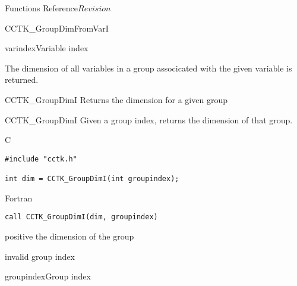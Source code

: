 \begin{cactuspart}{ Functions Reference}{}{$Revision$}
\begin{FunctionDescription}{CCTK\_GroupDimFromVarI}
\begin{ParameterSection}
\begin{Parameter}{varindex}Variable index\end{Parameter}
\end{ParameterSection}

\begin{Discussion}
The dimension of all variables in a group associcated with the given variable is returned.
\end{Discussion}

\begin{SeeAlsoSection}
\begin{SeeAlso}{CCTK\_GroupDimI}
Returns the dimension for a given group
\end{SeeAlso}
\end{SeeAlsoSection}
\end{FunctionDescription}

\begin{FunctionDescription}{CCTK\_GroupDimI}
\label{CCTK-GroupDimI}
Given a group index, returns the dimension of that group.

\begin{SynopsisSection}
\begin{Synopsis}{C}
\begin{verbatim}
#include "cctk.h"

int dim = CCTK_GroupDimI(int groupindex);
\end{verbatim}
\end{Synopsis}
\begin{Synopsis}{Fortran}
\begin{verbatim}
call CCTK_GroupDimI(dim, groupindex)
\end{verbatim}
\end{Synopsis}
\end{SynopsisSection}

\begin{ResultSection}
\begin{Result}{positive} the dimension of the group\end{Result}
\begin{Result}{-1} invalid group index \end{Result}
\end{ResultSection}

\begin{ParameterSection}
\begin{Parameter}{groupindex}Group index\end{Parameter}
\end{ParameterSection}


\end{FunctionDescription}
\end{cactuspart}
